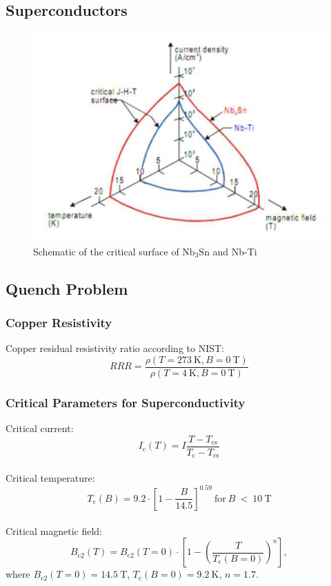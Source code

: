 \documentclass{article}
\begin{document}
\subsection{Superconductors}

\begin{figure}[ht!]
\centering
\includegraphics[width=0.49\linewidth]{figures/introduction/critical_surface_scheme.png}
\caption{Schematic of the critical surface of $\text{Nb}_\text{3}\text{Sn}$ and Nb-Ti \cite{evans_marvel_of_technology}}
\label{fig:scheme_critical_surface}
\end{figure}

\subsection{Quench Problem}

    \subsubsection{Copper Resistivity}
    Copper residual resistivity ratio according to NIST: 
    \begin{equation}
    RRR = \frac{\rho(T=273~\text{K}, B=0~\text{T})}{\rho(T=4~\text{K}, B=0~\text{T})}
    \end{equation}
    
    \subsubsection{Critical Parameters for Superconductivity}
    Critical current:
    \begin{equation}
        I_\text{c}(T) = I \frac{T-T_\text{cs}}{T_\text{c}-T_\text{cs}}
    \end{equation}
    \\
    Critical temperature:
    \begin{equation}
        T_\text{c}(B) = 9.2 \cdot [1- \frac{B}{14.5}]^{0.59}~\text{for}~B~<~10~\text{T}
    \end{equation}
    \\
    Critical magnetic field: 
    \begin{equation}
        B_\text{c2}(T) = B_\text{c2}(T=0) \cdot [1-(\frac{T}{T_\text{c}(B=0)})^{n}],
    \end{equation}
    where
    $B_\text{c2}(T=0)=14.5~\text{T}$, $T_\text{c}(B=0)=9.2~\text{K}$, $n=1.7$.
\end{document}
